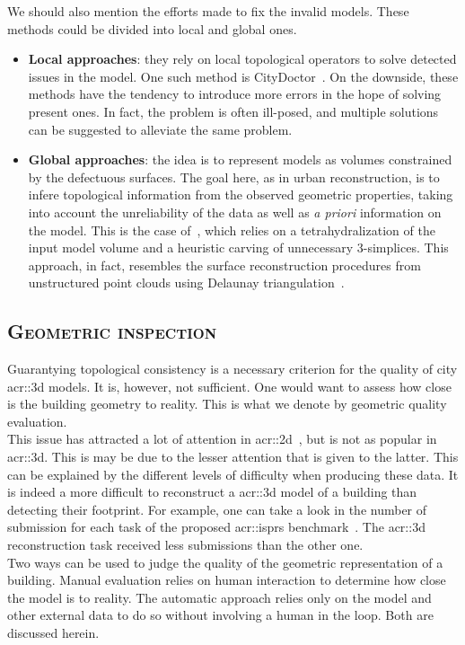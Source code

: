         We should also mention the efforts made to fix the invalid models. 
        These methods could be divided into local and global ones.
        \begin{itemize}
            \item \textbf{Local approaches}: they rely on local topological operators to solve detected issues in the model.
                One such method is CityDoctor~\parencite{alam2014towards}.
                On the downside, these methods have the tendency to introduce more errors in the hope of solving present ones.
                In fact, the problem is often ill-posed, and multiple solutions can be suggested to alleviate the same problem.
            \item \textbf{Global approaches}: the idea is to represent models as volumes constrained by the defectuous surfaces.
            The goal here, as in urban reconstruction, is to infere topological information from the observed geometric properties, taking into account the unreliability of the data as well as \textit{a priori} information on the model.
            This is the case of~\textcite{zhao2013automatic}, which relies on a tetrahydralization of the input model volume and a heuristic carving of unnecessary 3-simplices.
            This approach, in fact, resembles the surface reconstruction procedures from unstructured point clouds using Delaunay triangulation~\parencite{cazals2006delaunay, berger2014state}.
        \end{itemize}

    \subsection{\textsc{Geometric inspection}}
        \label{subsec::introduction::building_model_evaluation::geometric}
        Guarantying topological consistency is a necessary criterion for the quality of city \gls{acr::3d} models.
        It is, however, not sufficient.
        One would want to assess how close is the building geometry to reality.
        This is what we denote by geometric quality evaluation.\\
        This issue has attracted a lot of attention in \gls{acr::2d}~\parencite{mooney2010towards}, but is not as popular in \gls{acr::3d}.
        This is may be due to the lesser attention that is given to the latter.
        This can be explained by the different levels of difficulty when producing these data.
        It is indeed a more difficult to reconstruct a \gls{acr::3d} model of a building than detecting their footprint.
        For example, one can take a look in the number of submission for each task of the proposed \gls{acr::isprs} benchmark~\textcite{rottensteiner2012isprs, rottensteiner2014results}.
        The \gls{acr::3d} reconstruction task received less submissions than the other one.\\
        Two ways can be used to judge the quality of the geometric representation of a building.
        Manual evaluation relies on human interaction to determine how close the model is to reality.
        The automatic approach relies only on the model and other external data to do so without involving a human in the loop.
        Both are discussed herein.

